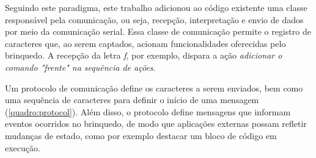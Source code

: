 Seguindo este paradigma, este trabalho adicionou ao código existente uma classe responsável pela comunicação, ou seja, recepção, interpretação e envio de dados por meio da comunicação serial. Essa classe de comunicação permite o registro de caracteres que, ao serem captados, acionam funcionalidades oferecidas pelo brinquedo. A recepção da letra \textit{f}, por exemplo, dispara a ação \textit{adicionar o comando "frente" na sequência de ações}.

Um protocolo de comunicação define os caracteres a serem enviados, bem como uma sequência de caracteres para definir o início de uma mensagem (\autoref{quadro:protocol}). Além disso, o protocolo define mensagens que informam eventos ocorridos no brinquedo, de modo que aplicações externas possam refletir mudanças de estado, como por exemplo destacar um bloco de código em execução.
